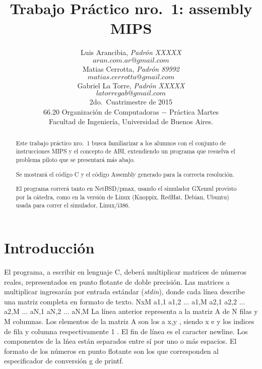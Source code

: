 \documentclass[a4paper,10pt]{article}
\begin{document}
\title{Trabajo Pr\'actico nro.~1: assembly MIPS} 

\author{	
Luis Arancibia, \textit{Padr\'on XXXXX} 	\\	\texttt{$aran.com.ar@gmail.com$}	\\[2.5ex] 	
Matias Cerrotta, \textit{Padr\'on 89992} 	\\	\texttt{$matias.cerrotta@gmail.com$} 		\\[2.5ex]
Gabriel La Torre, \textit{Padr\'on XXXXX}	\\	\texttt{$latorregab@gmail.com$}			\\[2.5ex]
\normalsize{2do.~Cuatrimestre de 2015}		\\
\normalsize{66.20 Organizaci\'on de Computadoras  $-$ Pr\'actica Martes}	\\
\normalsize{Facultad de Ingenier\'ia, Universidad de Buenos Aires.}			\\
}

\date{}
\maketitle
\thispagestyle{empty}   %
\pagebreak

\begin{abstract}
Este trabajo pr\'actico nro.~1 busca familiarizar a los alumnos con el conjunto de instrucciones MIPS y el concepto de ABI, extendiendo un programa que resuelva el problema piloto que se presentar\'a m\'as abajo. 

Se mostrar\'a el c\'odigo C y el c\'odigo Assembly generado para la correcta resoluci\'on.

El programa correr\'a tanto en NetBSD/pmax, usando el simulador GXemul provisto por la c\'atedra, como en la versi\'on de Linux (Knoppix, RedHat, Debian, Ubuntu) usada para correr el simulador, Linux/i386.

\end{abstract} 
\pagebreak


\section{Introducci\'on}

El programa, a escribir en lenguaje C, deber\'a multiplicar matrices de n\'umeros reales, representados en punto flotante de doble precisi\'on. Las matrices a multiplicar ingresar\'an por entrada est\'andar (\textit{stdin}), donde cada l\'inea describe una matriz completa en formato de texto.
\newline \newline
NxM a1,1 a1,2 ... a1,M a2,1 a2,2 ... a2,M ... aN,1 aN,2 ... aN,M
\newline \newline
La l\'inea anterior representa a la matriz A de N filas y M columnas. Los elementos de la matriz A son los a x,y , siendo x e y los indices de fila y columna respectivamente 1 . El fin de l\'inea es el caracter newline. Los componentes de la l\'nea est\'an separados entre s\'i por uno o m\'as espacios. El formato de los n\'umeros en punto flotante son los que corresponden al especificador de conversi\'on g de printf.
\end{document}
